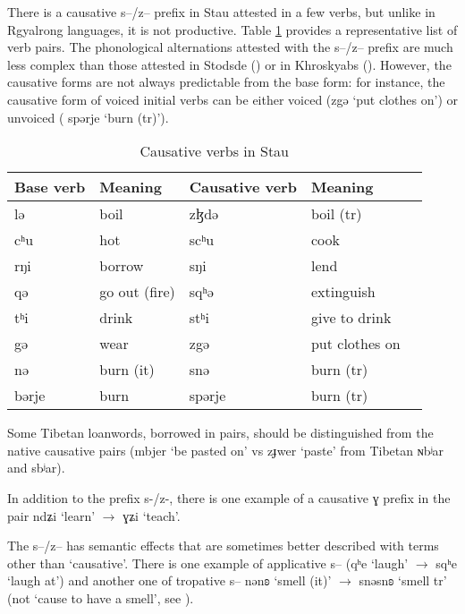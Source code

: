 \documentclass[oneside,a4paper,11pt]{article}
\newcommand{\ipa}[1]{{\phon #1}} %
\begin{document}
There is a causative \ipa{s--/z--} prefix in Stau attested in a few verbs, but unlike in Rgyalrong languages, it is not productive. Table \ref{tab:causative} provides a representative list of verb pairs. The phonological alternations attested with the \ipa{s--/z--} prefix are much less complex than those attested in Stodsde (\citealt{jackson07shangzhai}) or in Khroskyabs (\citealt{lai14caus}). However, the causative forms are not always predictable from the base form: for instance, the causative form of voiced initial verbs can be either voiced (\ipa{zgə} `put clothes on') or unvoiced ( \ipa{spərje} `burn (tr)').
 
 
   \begin{table}[H]
 \caption{Causative verbs in Stau} \label{tab:causative} \centering 
\begin{tabular}{lllll}
\toprule
Base verb & Meaning & Causative verb & Meaning \\
\midrule
 \ipa{lə}  &boil& \ipa{zɮdə}& boil (tr)\\
  \ipa{cʰu}  & hot &  \ipa{scʰu}& cook \\
    \ipa{rŋi}  & borrow &  \ipa{sŋi}& lend \\
    \ipa{qə}  & go out (fire) &  \ipa{sqʰə}& extinguish\\
    \ipa{tʰi}  & drink &  \ipa{stʰi} & give to drink\\
    \ipa{gə}  & wear &  \ipa{zgə} & put clothes on \\
     \ipa{nə}  & burn (it) &  \ipa{snə}& burn (tr)\\
     \ipa{bərje}  & burn &  \ipa{spərje} & burn (tr)\\
 \bottomrule
\end{tabular}
\end{table}

Some Tibetan  loanwords, borrowed in pairs, should be distinguished from the native causative pairs (\ipa{mbjer} `be pasted on' vs \ipa{zɟwer}  `paste' from Tibetan \ipa{ɴbʲar} and \ipa{sbʲar}).
 
 
 In addition to the prefix \ipa{s-/z-}, there is one example of a causative \ipa{ɣ} prefix in the pair   \ipa{ndʑi} `learn'    $\rightarrow$  \ipa{ɣʑi} `teach'.
     
The \ipa{s--/z--} has semantic effects that are sometimes better described with terms other than `causative'. There is one example of applicative \ipa{s--} (\ipa{qʰe}  `laugh' $\rightarrow$ \ipa{sqʰe} `laugh at') and another one of tropative \ipa{s--}  \ipa{nənʚ}  `smell (it)' $\rightarrow$ \ipa{snəsnʚ} `smell tr' (not `cause to have a smell', see \citealt{jacques13tropative}).
 
\end{document}
